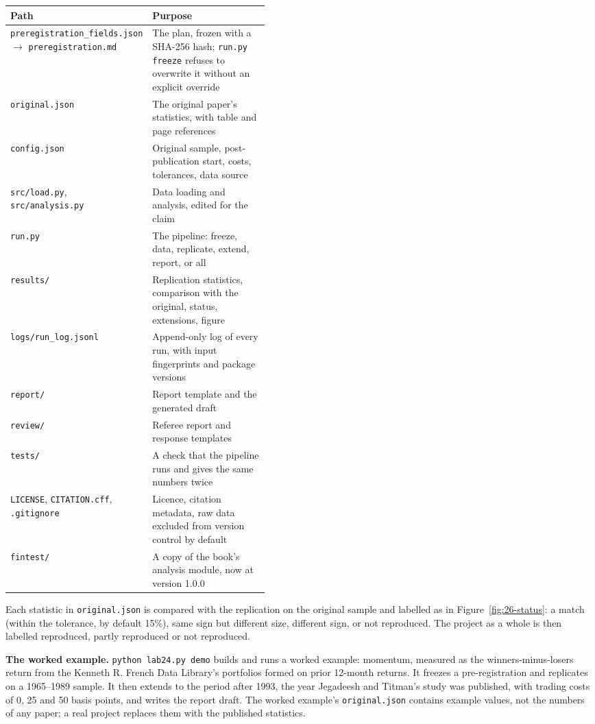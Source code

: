 \begin{center}
\small
\begin{tabularx}{0.9\linewidth}{@{}>{\raggedright\arraybackslash}p{0.44\linewidth}>{\raggedright\arraybackslash}X@{}}
\toprule
Path & Purpose \\
\midrule
\texttt{preregistration\_fields.json} $\rightarrow$ \texttt{preregistration.md} & The plan, frozen with a SHA-256 hash; \texttt{run.py freeze} refuses to overwrite it without an explicit override \\
\texttt{original.json} & The original paper's statistics, with table and page references \\
\texttt{config.json} & Original sample, post-publication start, costs, tolerances, data source \\
\texttt{src/load.py}, \texttt{src/analysis.py} & Data loading and analysis, edited for the claim \\
\texttt{run.py} & The pipeline: freeze, data, replicate, extend, report, or all \\
\texttt{results/} & Replication statistics, comparison with the original, status, extensions, figure \\
\texttt{logs/run\_log.jsonl} & Append-only log of every run, with input fingerprints and package versions \\
\texttt{report/} & Report template and the generated draft \\
\texttt{review/} & Referee report and response templates \\
\texttt{tests/} & A check that the pipeline runs and gives the same numbers twice \\
\texttt{LICENSE}, \texttt{CITATION.cff}, \texttt{.gitignore} & Licence, citation metadata, raw data excluded from version control by default \\
\texttt{fintest/} & A copy of the book's analysis module, now at version 1.0.0 \\
\bottomrule
\end{tabularx}
\end{center}

Each statistic in \texttt{original.json} is compared with the replication on the original sample and labelled as in Figure~\ref{fig:26-status}: a match (within the tolerance, by default 15\%), same sign but different size, different sign, or not reproduced. The project as a whole is then labelled reproduced, partly reproduced or not reproduced.

\textbf{The worked example.} \texttt{python lab24.py demo} builds and runs a worked example: momentum, measured as the winners-minus-losers return from the Kenneth R. French Data Library's portfolios formed on prior 12-month returns. It freezes a pre-registration and replicates on a 1965--1989 sample. It then extends to the period after 1993, the year Jegadeesh and Titman's study was published, with trading costs of 0, 25 and 50 basis points, and writes the report draft. The worked example's \texttt{original.json} contains example values, not the numbers of any paper; a real project replaces them with the published statistics.

